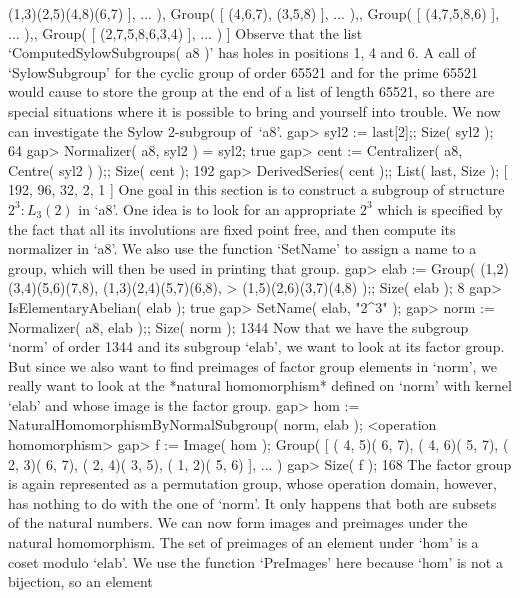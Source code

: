           (1,3)(2,5)(4,8)(6,7) ], ... ), Group( [ (4,6,7), (3,5,8) ], ... ),, 
      Group( [ (4,7,5,8,6) ], ... ),, Group( [ (2,7,5,8,6,3,4) ], ... ) ]
\endexample
Observe   that the   list `ComputedSylowSubgroups(   a8  )'  has holes in
positions 1, 4  and 6. A call of  `SylowSubgroup' for the cyclic group of
order 65521 and for the prime 65521 would cause {\GAP} to store the group
at the end  of a list  of length 65521,  so there are special  situations
where it is possible  to bring {\GAP}  and yourself into trouble.  We now
can investigate the Sylow 2-subgroup of~`a8'.
\beginexample
    gap> syl2 := last[2];; Size( syl2 );
    64
    gap> Normalizer( a8, syl2 ) = syl2;
    true
    gap> cent := Centralizer( a8, Centre( syl2 ) );; Size( cent );
    192
    gap> DerivedSeries( cent );; List( last, Size );
    [ 192, 96, 32, 2, 1 ]
\endexample
One  goal  in this  section   is to  construct  a  subgroup of  structure
$2^3:L_3(2)$ in `a8'. One idea is to look for  an appropriate $2^3$ which
is specified by the  fact that all  its involutions are fixed point free,
and  then  compute its normalizer   in  `a8'. We  also  use the  function
`SetName'  to  assign a name  to  a  group, which will   then  be used in
printing that group.
\beginexample
    gap> elab := Group( (1,2)(3,4)(5,6)(7,8), (1,3)(2,4)(5,7)(6,8),
    >                   (1,5)(2,6)(3,7)(4,8) );; Size( elab );
    8
    gap> IsElementaryAbelian( elab );
    true
    gap> SetName( elab, "2^3" );
    gap> norm := Normalizer( a8, elab );; Size( norm );
    1344
\endexample
Now that we  have the  subgroup  `norm' of  order  1344 and its  subgroup
`elab', we  want to look  at its factor group.  But since we also want to
find preimages of factor group elements in `norm', we really want to look
at the    *natural homomorphism* defined   on
`norm' with kernel `elab' and whose image is the factor group.
\beginexample
    gap> hom := NaturalHomomorphismByNormalSubgroup( norm, elab );
    <operation homomorphism>
    gap> f := Image( hom );
    Group( [ ( 4, 5)( 6, 7), ( 4, 6)( 5, 7), ( 2, 3)( 6, 7), ( 2, 4)( 3, 5), 
      ( 1, 2)( 5, 6) ], ... )
    gap> Size( f );
    168
\endexample
The  factor group  is again   represented  as a permutation  group, whose
operation domain, however,  has nothing to do  with the one of `norm'. It
only happens that both  are subsets  of the natural  numbers. We  can now
form  images  and preimages under  the  natural  homomorphism. The set of
preimages of an element under `hom' is a coset  modulo `elab'. We use the
function `PreImages' here because `hom' is not a bijection, so an element
